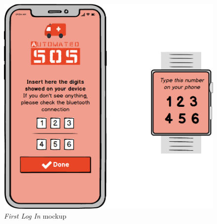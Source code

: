 \begin{figure}
\begin{center}
  \includegraphics[width=\textwidth]{img/mockup/First_Login.png}
  \hspace{0.05\linewidth}
  \centering
  \caption{\textit{First Log In} mockup}
  \label{img:firstLogInMockup}
\end{center}
\end{figure}

